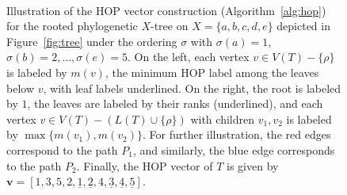 \documentclass{article}
\newcommand{\ul}{\underline}
\begin{document}
\begin{figure}[!t]
\begin{center}
\\
\end{center}
\caption{Illustration of the HOP vector construction (Algorithm~\ref{alg:hop}) for the rooted phylogenetic $X$-tree on $X = \{a,b,c,d,e\}$ depicted in Figure~\ref{fig:tree} under the ordering $\sigma$ with $\sigma(a)=1$, $\sigma(b)=2, \ldots, \sigma(e)=5$. On the left, each  vertex $v \in V(T) - \{\rho\}$ is labeled by $m(v)$, the minimum HOP label among the leaves below $v$, with leaf labels underlined. On the right, the root is labeled by $1$, the leaves are labeled by their ranks (underlined), and each vertex $v \in V(T) - (L(T) \cup \{\rho\})$ with children $v_1, v_2$ is labeled by $\max \{m(v_1), m(v_2)\}$. For further illustration, the red edges correspond to the path $P_1$, and similarly, the blue edge corresponds to the path $P_2$. Finally, the HOP vector of $T$ is given by $\mathbf{v}=[1,3,5,2,\ul{1},\ul{2},4,\ul{3},\ul{4},\ul{5}]$.}
\end{figure}
\end{document}
